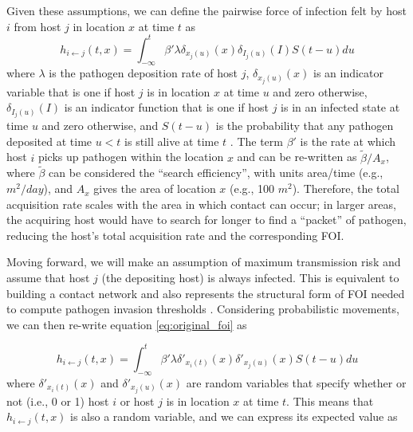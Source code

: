 \documentclass[letterpaper]{article}
\begin{document}
Given these assumptions, we can define the pairwise force of infection felt by host $i$ from host $j$ in location $x$ at time $t$ as \citep{Wilber2022}
\begin{equation}
    h_{i \leftarrow j}(t, x) = \int_{-\infty}^{t} \beta' \lambda \delta_{x_j(u)}(x) \delta_{I_j(u)}(I) S(t - u) du
    \label{eq:original_foi}
\end{equation}
where $\lambda$ is the pathogen deposition rate of host $j$, $\delta_{x_j(u)}(x)$ is an indicator variable that is one if host $j$ is in location $x$ at time $u$ and zero otherwise, $\delta_{I_j(u)}(I)$ is an indicator function that is one if host $j$ is in an infected state at time $u$ and zero otherwise, and $S(t-u)$ is the probability that any pathogen deposited at time $u < t$ is still alive at time $t$ \citep[see][for a full derivation]{Wilber2022}.  
The term $\beta'$ is the rate at which host $i$ picks up pathogen within the location $x$ and can be re-written as $\tilde{\beta} / A_x$, where $\tilde{\beta}$ can be considered the ``search efficiency'', with units area/time (e.g., $m^2 / day$), and $A_x$ gives the area of location $x$ (e.g., 100 $m^2$). 
Therefore, the total acquisition rate scales with the area in which contact can occur; in larger areas, the acquiring host would have to search for longer to find a ``packet'' of pathogen, reducing the host's total acquisition rate and the corresponding FOI.

Moving forward, we will make an assumption of maximum transmission risk and assume that host $j$ (the depositing host) is always infected. 
This is equivalent to building a contact network and also represents the structural form of FOI needed to compute pathogen invasion thresholds \citep{Wilber2022}.
Considering probabilistic movements, we can then re-write equation \ref{eq:original_foi} as

\begin{equation}
    h_{i \leftarrow j}(t, x) = \int_{-\infty}^{t} \beta' \lambda \delta'_{x_i(t)}(x) \delta'_{x_j(u)}(x) S(t - u) du
    \label{eq:prob_foi}
\end{equation}
where $\delta'_{x_i(t)}(x)$ and $\delta'_{x_j(u)}(x)$ are random variables that specify whether or not (i.e., 0 or 1) host $i$ or host $j$ is in location $x$ at time $t$.  This means that $h_{i \leftarrow j}(t, x)$ is also a random variable, and we can express its expected value as 
\end{document}
